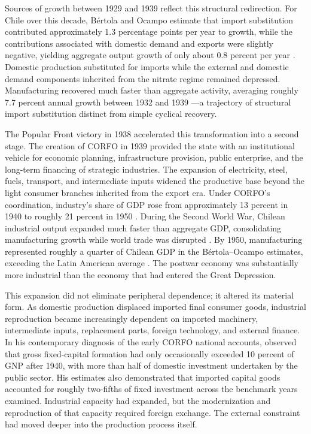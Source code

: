 Sources of growth between 1929 and 1939 reflect this structural redirection. For Chile over this decade, B\'ertola and Ocampo estimate that import substitution contributed approximately 1.3 percentage points per year to growth, while the contributions associated with domestic demand and exports were slightly negative, yielding aggregate output growth of only about 0.8 percent per year \citep{BertolaOcampo2021}. Domestic production substituted for imports while the external and domestic demand components inherited from the nitrate regime remained depressed. Manufacturing recovered much faster than aggregate activity, averaging roughly 7.7 percent annual growth between 1932 and 1939 \citep{BulmerThomas2010}---a trajectory of structural import substitution distinct from simple cyclical recovery.

The Popular Front victory in 1938 accelerated this transformation into a second stage. The creation of CORFO in 1939 provided the state with an institutional vehicle for economic planning, infrastructure provision, public enterprise, and the long-term financing of strategic industries. The expansion of electricity, steel, fuels, transport, and intermediate inputs widened the productive base beyond the light consumer branches inherited from the export era. Under CORFO's coordination, industry's share of GDP rose from approximately 13 percent in 1940 to roughly 21 percent in 1950 \citep{Silva2007}. During the Second World War, Chilean industrial output expanded much faster than aggregate GDP, consolidating manufacturing growth while world trade was disrupted \citep{BulmerThomas2010}. By 1950, manufacturing represented roughly a quarter of Chilean GDP in the B\'ertola--Ocampo estimates, exceeding the Latin American average \citep{BertolaOcampo2021}. The postwar economy was substantially more industrial than the economy that had entered the Great Depression.

This expansion did not eliminate peripheral dependence; it altered its material form. As domestic production displaced imported final consumer goods, industrial reproduction became increasingly dependent on imported machinery, intermediate inputs, replacement parts, foreign technology, and external finance. In his contemporary diagnosis of the early CORFO national accounts, \citet{Kaldor1959} observed that gross fixed-capital formation had only occasionally exceeded 10 percent of GNP after 1940, with more than half of domestic investment undertaken by the public sector. His estimates also demonstrated that imported capital goods accounted for roughly two-fifths of fixed investment across the benchmark years examined. Industrial capacity had expanded, but the modernization and reproduction of that capacity required foreign exchange. The external constraint had moved deeper into the production process itself.

